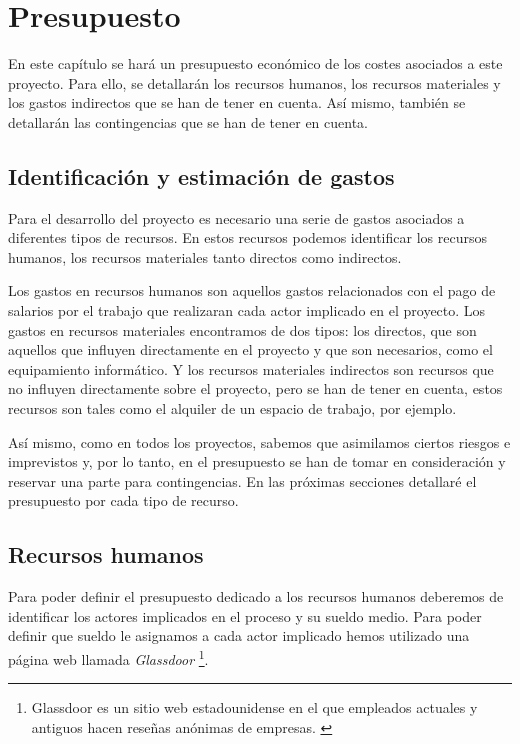 \chapter{Presupuesto}
\label{cap:presupuesto}


En este capítulo se hará un presupuesto económico de los costes asociados a este proyecto.
Para ello, se detallarán los recursos humanos, los recursos materiales y los gastos indirectos
que se han de tener en cuenta. Así mismo, también se detallarán las contingencias que se han
de tener en cuenta.

\section{Identificación y estimación de gastos}
\label{sec:identificacion_gastos}


Para el desarrollo del proyecto es necesario una serie de gastos asociados a diferentes tipos
de recursos. En estos recursos podemos identificar los recursos humanos, los recursos materiales
tanto directos como indirectos.

Los gastos en recursos humanos son aquellos gastos relacionados con el pago de salarios por el
trabajo que realizaran cada actor implicado en el proyecto. Los gastos en recursos materiales
encontramos de dos tipos: los directos, que son aquellos que influyen directamente en el proyecto
y que son necesarios, como el equipamiento informático. Y los recursos materiales indirectos son
recursos que no influyen directamente sobre el proyecto, pero se han de tener en cuenta,
estos recursos son tales como el alquiler de un espacio de trabajo, por ejemplo.

Así mismo, como en todos los proyectos, sabemos que asimilamos ciertos riesgos e imprevistos y,
por lo tanto, en el presupuesto se han de tomar en consideración y reservar una parte para
contingencias. En las próximas secciones detallaré el presupuesto por cada tipo de recurso.

\section{Recursos humanos}
\label{sec:recursos_humanos}


Para poder definir el presupuesto dedicado a los recursos humanos deberemos de identificar
los actores implicados en el proceso y su sueldo medio. Para poder definir que sueldo
le asignamos a cada actor implicado hemos utilizado una página web llamada \textit{Glassdoor}
\footnote{Glassdoor es un sitio web estadounidense en el que empleados actuales y antiguos
hacen reseñas anónimas de empresas. \cite{Glassdoor}}.


